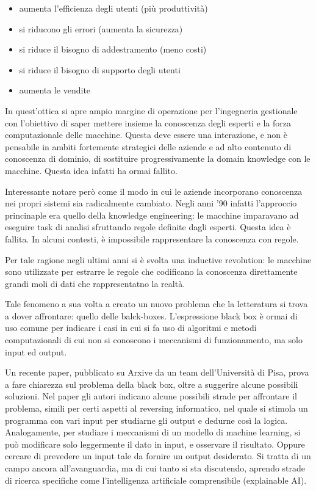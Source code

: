 \documentclass[]{book}
\providecommand{\tightlist}{%
  \setlength{\itemsep}{0pt}\setlength{\parskip}{0pt}}
\begin{document}
\begin{itemize}
\tightlist
\item
  aumenta l'efficienza degli utenti (più produttività)
\item
  si riducono gli errori (aumenta la sicurezza)
\item
  si riduce il bisogno di addestramento (meno costi)
\item
  si riduce il bisogno di supporto degli utenti
\item
  aumenta le vendite
\end{itemize}

In quest'ottica si apre ampio margine di operazione per l'ingegneria
gestionale con l'obiettivo di saper mettere insieme la conoscenza degli
esperti e la forza computazionale delle macchine. Questa deve essere una
interazione, e non è pensabile in ambiti fortemente strategici delle
aziende e ad alto contenuto di conoscenza di dominio, di sostituire
progressivamente la domain knowledge con le macchine. Questa idea
infatti ha ormai fallito.

Interessante notare però come il modo in cui le aziende incorporano
conoscenza nei propri sistemi sia radicalmente cambiato. Negli anni '90
infatti l'approccio princinaple era quello della knowledge engineering:
le macchine imparavano ad eseguire task di analisi sfruttando regole
definite dagli esperti. Questa idea è fallita. In alcuni contesti, è
impossibile rappresentare la conoscenza con regole.

Per tale ragione negli ultimi anni si è svolta una inductive revolution:
le macchine sono utilizzate per estrarre le regole che codificano la
conoscenza direttamente grandi moli di dati che rappresentatno la
realtà.

Tale fenomeno a sua volta a creato un nuovo problema che la letteratura
si trova a dover affrontare: quello delle balck-boxes. L'espressione
black box è ormai di uso comune per indicare i casi in cui si fa uso di
algoritmi e metodi computazionali di cui non si conoscono i meccanismi
di funzionamento, ma solo input ed output.

Un recente paper, pubblicato su Arxive da un team dell'Università di
Pisa, prova a fare chiarezza sul problema della black box, oltre a
suggerire alcune possibili soluzioni. Nel paper gli autori indicano
alcune possibili strade per affrontare il problema, simili per certi
aspetti al reversing informatico, nel quale si stimola un programma con
vari input per studiarne gli output e dedurne così la logica.
Analogamente, per studiare i meccanismi di un modello di machine
learning, si può modificare solo leggermente il dato in input, e
osservare il risultato. Oppure cercare di prevedere un input tale da
fornire un output desiderato. Si tratta di un campo ancora
all'avanguardia, ma di cui tanto si sta discutendo, aprendo strade di
ricerca specifiche come l'intelligenza artificiale comprensibile
(explainable AI).
\end{document}
